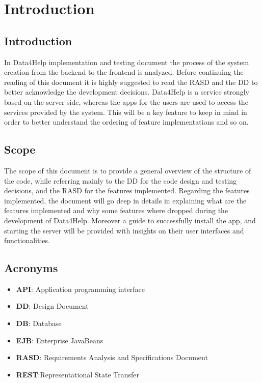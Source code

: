 \section{Introduction}

\subsection{Introduction}
In Data4Help implementation and testing document the process of the system creation from the backend to the frontend is analyzed. Before continuing the reading of this document it is highly suggested to read the RASD and the DD to better acknowledge the development decisions.
Data4Help is a service strongly based on the server side, whereas the apps for the users are used to access 
the services provided by the system.
This will be a key feature to keep in mind in order to better understand the ordering of feature implementations and so on.

\subsection{Scope}
The scope of this document is to provide a general overview of the structure of the code, while referring mainly to the DD for the code design and testing decisions, and the RASD for the features implemented.
Regarding the features implemented, the document will go deep in details in explaining what are the features implemented and why some features where dropped during the development of Data4Help.
Moreover a guide to successfully install the app, and starting the server will be provided with insights on their user interfaces and functionalities.


\subsection{Acronyms}

\begin{itemize}
\item \textbf{API}: Application programming interface
\item \textbf{DD}: Design Document
\item \textbf{DB}: Database
\item \textbf{EJB}: Enterprise JavaBeans
\item \textbf{RASD}: Requirements Analysis and Specifications Document
\item \textbf{REST}:Representational State Transfer
\end{itemize}


